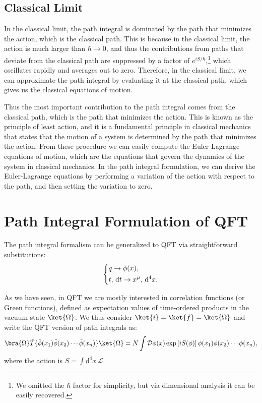 \subsection{Classical Limit}

In the classical limit, the path integral is dominated by the path that minimizes the action, which is the classical path. This is because in the classical limit, the action is much larger than \(\hbar \to 0\), and thus the contributions from paths that deviate from the classical path are suppressed by a factor of \(e^{i S/\hbar}\),\footnote{We omitted the \(\hbar\) factor for simplicity, but via dimensional analysis it can be easily recovered.} which oscillates rapidly and averages out to zero. Therefore, in the classical limit, we can approximate the path integral by evaluating it at the classical path, which gives us the classical equations of motion.

Thus the most important contribution to the path integral comes from the classical path, which is the path that minimizes the action. This is known as the principle of least action, and it is a fundamental principle in classical mechanics that states that the motion of a system is determined by the path that minimizes the action. From these procedure we can easily compute the Euler-Lagrange equations of motion, which are the equations that govern the dynamics of the system in classical mechanics. In the path integral formulation, we can derive the Euler-Lagrange equations by performing a variation of the action with respect to the path, and then setting the variation to zero.

\section{Path Integral Formulation of QFT}

The path integral formalism can be generalized to QFT via straightforward substitutions:
\[
    \begin{dcases}
        q \to \phi(x), \\
        t, \, \mathrm{d} t \to x^{\mu}, \, \mathrm{d}^4 x.
    \end{dcases}
\]

As we have seen, in QFT we are mostly interested in correlation functions (or Green functions), defined as expectation values of time-ordered products in the vacuum state $\ket{\Omega}$. We thus consider $\ket{i} = \ket{f} = \ket{\Omega}$ and write the QFT version of path integrals as:
\[
    \bra{\Omega} \hat{T} \{\hat{\phi}(x_1) \hat{\phi}(x_2) \cdots \hat{\phi} (x_n)\} \ket{\Omega} = N \int \mathcal{D} \phi(x) \exp\left[i S(\phi)\right] \phi(x_1) \phi(x_2) \cdots \phi(x_n),
\]
where the action is $S = \int \mathrm{d}^4 x \, \mathcal{L}$.

